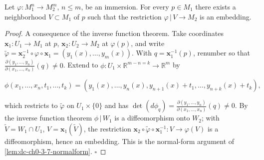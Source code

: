 \begin{proposition}
  \label{prop:dc-ch0-3-7}
  \leanok
  Let $\varphi:M_1^n\to M_2^m$, $n\le m$, be an immersion. For every $p\in M_1$
  there exists a neighborhood $V\subset M_1$ of $p$ such that the restriction
  $\varphi\,|\,V\to M_2$ is an embedding.
\end{proposition}
\begin{proof}
  \sketch
  \leanok
  A consequence of the inverse function theorem. Take coordinates
  $\mathbf{x}_1:U_1\to M_1$ at $p$, $\mathbf{x}_2:U_2\to M_2$ at $\varphi(p)$, and
  write $\tilde\varphi=\mathbf{x}_2^{-1}\circ\varphi\circ\mathbf{x}_1=(y_1(x),\dots,y_m(x))$.
  With $q=\mathbf{x}_1^{-1}(p)$, renumber so that
  $\frac{\partial(y_1,\dots,y_n)}{\partial(x_1,\dots,x_n)}(q)\neq0$. Extend to
  $\phi:U_1\times\mathbb{R}^{m-n=k}\to\mathbb{R}^m$ by
  
  $$
  \phi(x_1,\dots,x_n,t_1,\dots,t_k)=(y_1(x),\dots,y_n(x),y_{n+1}(x)+t_1,\dots,y_{n+k}(x)+t_k),
  $$
  
  which restricts to $\tilde\varphi$ on $U_1\times\{0\}$ and has
  $\det(d\phi_q)=\frac{\partial(y_1,\dots,y_n)}{\partial(x_1,\dots,x_n)}(q)\neq0$. By
  the inverse function theorem $\phi\,|\,W_1$ is a diffeomorphism onto $W_2$; with
  $\tilde V=W_1\cap U_1$, $V=\mathbf{x}_1(\tilde V)$, the restriction
  $\mathbf{x}_2\circ\tilde\varphi\circ\mathbf{x}_1^{-1}:V\to\varphi(V)$ is a
  diffeomorphism, hence an embedding. This is the normal-form argument of
  \cref{lem:dc-ch0-3-7-normalform}. $\square$

\end{proof}

